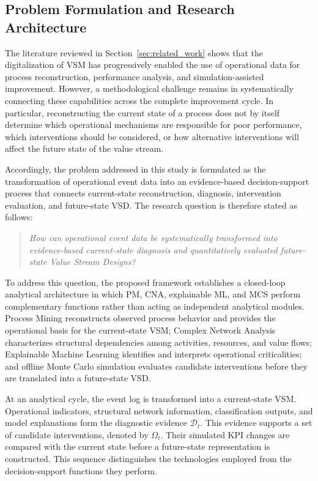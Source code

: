 \documentclass[pdflatex,iicol,Numbered,sn-basic]{sn-jnl}
\begin{document}
\subsection{Problem Formulation and Research Architecture}
\label{subsec:problem_formulation}

The literature reviewed in Section~\ref{sec:related_work} shows that the
digitalization of VSM has progressively enabled the
use of operational data for process reconstruction, performance analysis,
and simulation-assisted improvement. However, a methodological challenge
remains in systematically connecting these capabilities across the complete
improvement cycle. In particular, reconstructing the current state of a
process does not by itself determine which operational mechanisms are
responsible for poor performance, which interventions should be considered,
or how alternative interventions will affect the future state of the value
stream.

Accordingly, the problem addressed in this study is formulated as the
transformation of operational event data into an evidence-based
decision-support process that connects current-state reconstruction,
diagnosis, intervention evaluation, and future-state VSD. The research question is therefore stated as follows:

\begin{quote}
\textit{How can operational event data be systematically transformed into
evidence-based current-state diagnosis and quantitatively evaluated
future-state Value Stream Designs?}
\end{quote}

To address this question, the proposed framework establishes a closed-loop
analytical architecture in which PM, CNA, explainable ML, and MCS perform complementary functions rather than acting as independent
analytical modules. Process Mining reconstructs observed process behavior
and provides the operational basis for the current-state VSM; Complex
Network Analysis characterizes structural dependencies among activities,
resources, and value flows; Explainable Machine Learning identifies and
interprets operational criticalities; and offline Monte Carlo simulation evaluates
candidate interventions before they are translated into a future-state VSD.

At an analytical cycle, the event log is transformed into a current-state VSM. Operational indicators, structural network information, classification outputs, and model explanations form the diagnostic evidence \(\mathcal{D}_t\). This evidence supports a set of candidate interventions, denoted by \(\Omega_t\). Their simulated KPI changes are compared with the current state before a future-state representation is constructed. This sequence distinguishes the technologies employed from the decision-support functions they perform.
\end{document}
